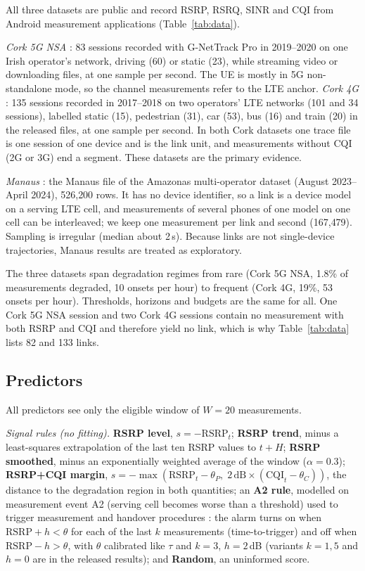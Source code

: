 \documentclass[preprint,review,12pt]{elsarticle}
\begin{document}
All three datasets are public and record RSRP, RSRQ, SINR and CQI from Android
measurement applications (Table~\ref{tab:data}).

\emph{Cork 5G NSA} \cite{raca2020}: 83 sessions recorded with G-NetTrack Pro in
2019--2020 on one Irish operator's network, driving (60) or static (23), while
streaming video or downloading files, at one sample per second. The UE is mostly in
5G non-standalone mode, so the channel measurements refer to the LTE anchor.
\emph{Cork 4G} \cite{raca2018}: 135 sessions recorded in 2017--2018 on two operators'
LTE networks (101 and 34 sessions), labelled static (15), pedestrian (31), car (53),
bus (16) and train (20) in the released files, at one sample per second. In both
Cork datasets one trace file is one session of one device and is the link unit, and
measurements without CQI (2G or 3G) end a segment. These datasets are the primary
evidence.

\emph{Manaus} \cite{silva2024}: the Manaus file of the Amazonas multi-operator
dataset (August 2023--April 2024), 526{,}200 rows. It has no device identifier, so a
link is a device model on a serving LTE cell, and measurements of several phones of
one model on one cell can be interleaved; we keep one measurement per link and
second (167{,}479). Sampling is irregular (median about 2\,s). Because links are not
single-device trajectories, Manaus results are treated as exploratory.

The three datasets span degradation regimes from rare (Cork 5G NSA, 1.8\% of
measurements degraded, 10 onsets per hour) to frequent (Cork 4G, 19\%, 53 onsets
per hour). Thresholds, horizons and budgets are the same for all. One Cork 5G NSA
session and two Cork 4G sessions contain no measurement with both RSRP and CQI and
therefore yield no link, which is why Table~\ref{tab:data} lists 82 and 133 links.

\subsection{Predictors}
All predictors see only the eligible window of $W=20$ measurements.

\emph{Signal rules (no fitting).} \textbf{RSRP level}, $s=-\mathrm{RSRP}_t$;
\textbf{RSRP trend}, minus a least-squares extrapolation of the last ten RSRP values
to $t+H$; \textbf{RSRP smoothed}, minus an exponentially weighted average of the
window ($\alpha=0.3$); \textbf{RSRP+CQI margin},
$s=-\max(\mathrm{RSRP}_t-\theta_P,\;2\,\mathrm{dB}\times(\mathrm{CQI}_t-\theta_C))$, the
distance to the degradation region in both quantities; an \textbf{A2 rule}, modelled
on measurement event A2 (serving cell becomes worse than a threshold) used to trigger
measurement and handover procedures \cite{ts38331}: the alarm turns on when
$\mathrm{RSRP}+h<\theta$ for each of the last $k$ measurements (time-to-trigger) and off
when $\mathrm{RSRP}-h>\theta$, with $\theta$ calibrated like $\tau$ and $k=3$, $h=2$\,dB
(variants $k=1,5$ and $h=0$ are in the released results); and \textbf{Random}, an
uninformed score.
\end{document}
